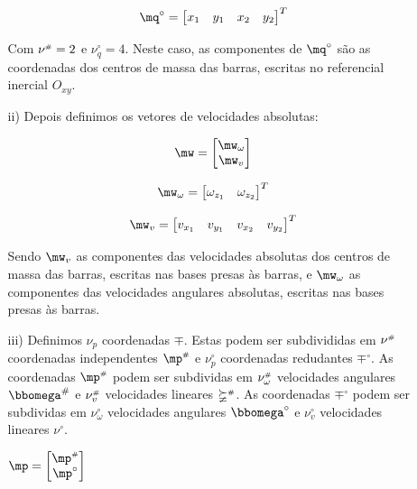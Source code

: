 \begin{itemize}
\begin{itemize}
	\begin{equation}
	\mq^\circ = \begin{bmatrix}
	x_1 & y_1 & x_2 & y_2
	\end{bmatrix}^T
	\end{equation}

	Com $\nu^{\scriptscriptstyle \#} = 2$ e $\nu_q^\circ = 4$. Neste caso, as componentes de $\mq^\circ$ s\~ao as coordenadas dos centros de massa das barras, escritas no referencial 	inercial $O_{xy}$. \\
	
	\item[ii)] Depois definimos os vetores de velocidades absolutas:
	
	$$ \mw =
	\begin{bmatrix}
	\mw_\omega \\
	\mw_v
	\end{bmatrix}
	$$
	
	\begin{equation}
	\mw_\omega = \begin{bmatrix}
	\omega_{z_1} & \omega_{z_2}
	\end{bmatrix}^T
	\end{equation}
	
	\begin{equation}
	\mw_v = \begin{bmatrix}
	v_{x_1} & v_{y_1} & v_{x_2} & v_{y_2}
	\end{bmatrix}^T
	\end{equation}
	
	Sendo $\mw_v$ as componentes das velocidades absolutas dos centros de massa das barras, escritas nas bases presas às barras, e $\mw_\omega$ as componentes das velocidades angulares absolutas, escritas nas bases presas às barras. \\
	
	\item[iii)] Definimos $\nu_p$ coordenadas  $\mp$. Estas podem ser subdivididas em $\nu^{\scriptscriptstyle \#}$ coordenadas independentes $\mp\ssh$ e $\nu_p^\circ$ coordenadas redudantes $\mp^\circ$. As coordenadas $\mp\ssh$ podem ser subdividas em $\nu_\omega^{\scriptscriptstyle \#}$ velocidades angulares $\momega^{\#}$ e $\nu_v^{\scriptscriptstyle \#}$ velocidades lineares $\mathbb{\nu}^{\scriptscriptstyle \#}$. As coordenadas $\mp^\circ$ podem ser subdividas em $\nu_\omega^\circ$ velocidades angulares $\momega^\circ$ e $\nu_v^\circ$ velocidades lineares $\mathbb{\nu}^\circ$.
	
	
	\begin{multicols}{3}
	$ \mp = \begin{bmatrix}
	\mp\ssh \\
	\mp^\circ
	\end{bmatrix} $


\end{multicols}
\end{itemize}
\end{itemize}

